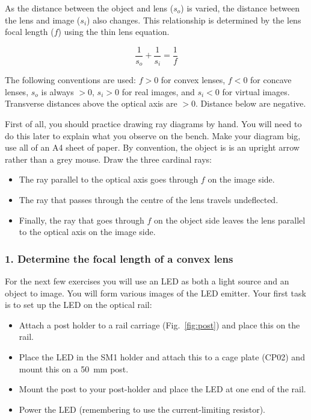 \documentclass[a4paper]{report}
\begin{document}
As the distance between the object and lens ($s_o$) is varied, the distance between the lens and image ($s_i$) also changes. This relationship is determined by the lens focal length ($f$) using the thin lens equation.

\begin{equation}
\frac{1}{s_o} + \frac{1}{s_i} = \frac{1}{f}
\label{eq:thinlens}
\end{equation}

The following conventions are used: $f>0$ for convex lenses, $f<0$ for concave lenses, $s_o$ is always $>0$, $s_i>0$ for real images, and $s_i<0$ for virtual images.
Transverse distances above the optical axis are $>0$. Distance below are negative. 

\vspace{2em}
First of all, you should practice drawing ray diagrams by hand. 
You will need to do this later to explain what you observe on the bench.
Make your diagram big, use all of an A4 sheet of paper. 
By convention, the object is is an upright arrow rather than a grey mouse.
Draw the three cardinal rays:
\begin{itemize}
\item The ray parallel to the optical axis goes through $f$ on the image side.
\item The ray that passes through the centre of the lens travels undeflected.
\item Finally, the ray that goes through $f$ on the object side leaves the lens parallel to the optical axis on the image side. 
\end{itemize}




\clearpage




\subsubsection{1. Determine the focal length of a convex lens }
For the next few exercises you will use an LED as both a light source and an object to image.
You will form various images of the LED emitter. 
Your first task is to set up the LED on the optical rail:

\begin{itemize}
\item Attach a post holder to a rail carriage (Fig.~\ref{fig:post}) and place this on the rail. 
\item Place the LED in the SM1 holder and attach this to a cage plate (CP02) and mount this on a 50~mm post. 
\item Mount the post to your post-holder and place the LED at one end of the rail.
\item Power the LED (remembering to use the current-limiting resistor). 
\end{itemize}
\end{document}
